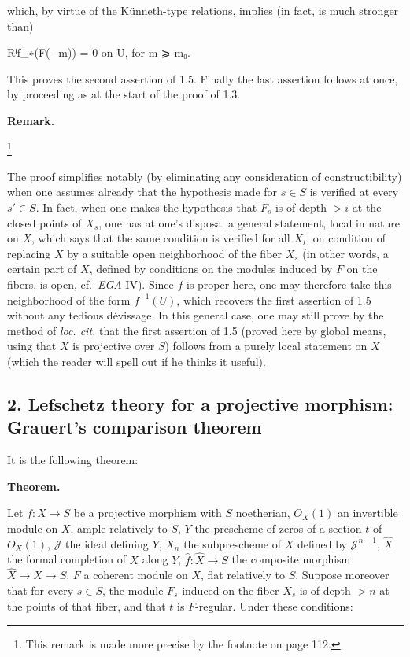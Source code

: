 \documentclass[
]{article}
\newenvironment{Shaded}{}{}
\newcommand{\NormalTok}[1]{#1}
\begin{document}
which, by virtue of the Künneth-type relations, implies (in fact, is
much stronger than)

\begin{Shaded}
\begin{Highlighting}[]
\NormalTok{Rⁱf\_∗(F(−m)) = 0 on U, for m ⩾ m₀.}
\end{Highlighting}
\end{Shaded}

This proves the second assertion of 1.5. Finally the last assertion
follows at once, by proceeding as at the start of the proof of 1.3.

\textbf{Remark.}

\footnote{This remark is made more precise by the footnote on page 112.}

The proof simplifies notably (by eliminating any consideration of
constructibility) when one assumes already that the hypothesis made for
\(s \in S\) is verified at every \(s' \in S\). In fact, when one makes
the hypothesis that \(F_{s}\) is of depth \(> i\) at the closed points
of \(X_{s}\), one has at one's disposal a general statement, local in
nature on \(X\), which says that the same condition is verified for all
\(X_{t}\), on condition of replacing \(X\) by a suitable open
neighborhood of the fiber \(X_{s}\) (in other words, a certain part of
\(X\), defined by conditions on the modules induced by \(F\) on the
fibers, is open, cf.~\emph{EGA} IV). Since \(f\) is proper here, one may
therefore take this neighborhood of the form \(f^{-1}(U)\), which
recovers the first assertion of 1.5 without any tedious dévissage. In
this general case, one may still prove by the method of \emph{loc. cit.}
that the first assertion of 1.5 (proved here by global means, using that
\(X\) is projective over \(S\)) follows from a purely local statement on
\(X\) (which the reader will spell out if he thinks it useful).

\subsection{2. Lefschetz theory for a projective morphism: Grauert's
comparison
theorem}\label{lefschetz-theory-for-a-projective-morphism-grauerts-comparison-theorem}

It is the following theorem:

\textbf{Theorem.}

Let \(f: X \to S\) be a projective morphism with \(S\) noetherian,
\(O_{X}(1)\) an invertible module on \(X\), ample relatively to \(S\),
\(Y\) the prescheme of zeros of a section \(t\) of \(O_{X}(1)\),
\(\mathcal{J}\) the ideal defining \(Y\), \(X_{n}\) the subprescheme of
\(X\) defined by \(\mathcal{J}^{n+1}\), \(\hat{X}\) the formal
completion of \(X\) along \(Y\), \(\hat{f}: \hat{X} \to S\) the
composite morphism \(\hat{X} \to X \to S\), \(F\) a coherent module on
\(X\), flat relatively to \(S\). Suppose moreover that for every
\(s \in S\), the module \(F_{s}\) induced on the fiber \(X_{s}\) is of
depth \(> n\) at the points of that fiber, and that \(t\) is
\(F\)-regular. Under these conditions:
\end{document}
